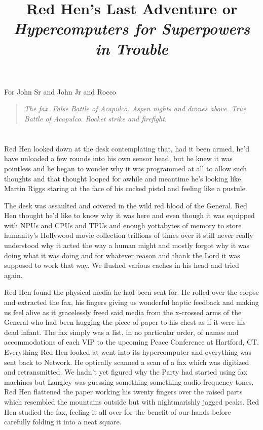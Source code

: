 \documentclass[13pt|draft]{report}
\title{Red Hen's Last Adventure or \em Hypercomputers for Superpowers in Trouble}
\begin{document}
\maketitle
\clearpage
\begin{center}
    \thispagestyle{empty}
    \vspace*{\fill}
    For John Sr and John Jr and Rocco
    \vspace*{\fill}
\end{center}
\clearpage

\begin{quote}
{\em\small{The fax. False Battle of Acapulco. Aspen nights and drones above. True Battle of Acapulco. Rocket strike and firefight.}}
\end{quote} 

\section*{} %

Red Hen looked down at the desk contemplating that, had it been armed, he'd have unloaded a few rounds into his own sensor head, but he knew it was pointless and he began to wonder why it was programmed at all to allow such thoughts and that thought looped for awhile and meantime he's looking like Martin Riggs staring at the face of his cocked pistol and feeling like a pustule.

The desk was assaulted and covered in the wild red blood of the General. Red Hen thought he'd like to know why it was here and even though it was equipped with NPUs and CPUs and TPUs and enough yottabytes of memory to store humanity's Hollywood movie collection trillions of times over it still never really understood why it acted the way a human might and mostly forgot why it was doing what it was doing and for whatever reason and thank the Lord it was supposed to work that way. We flushed various caches in his head and tried again.

Red Hen found the physical media he had been sent for. He rolled over the corpse and extracted the fax, his fingers giving us wonderful haptic feedback and making us feel alive as it gracelessly freed said media from the x-crossed arms of the General who had been hugging the piece of paper to his chest as if it were his dead infant. The fax simply was a list, in no particular order, of names and accommodations of each VIP to the upcoming Peace Conference at Hartford, CT. Everything Red Hen looked at went into its hypercomputer and everything was sent back to Network. He optically scanned a scan of a fax which was digitized and retransmitted. We hadn't yet figured why the Party had started using fax machines but Langley was guessing something-something audio-frequency tones. Red Hen flattened the paper working his twenty fingers over the raised parts which resembled the mountains outside but with nightmarishly jagged peaks. Red Hen studied the fax, feeling it all over for the benefit of our hands before carefully folding it into a neat square.
\end{document}
